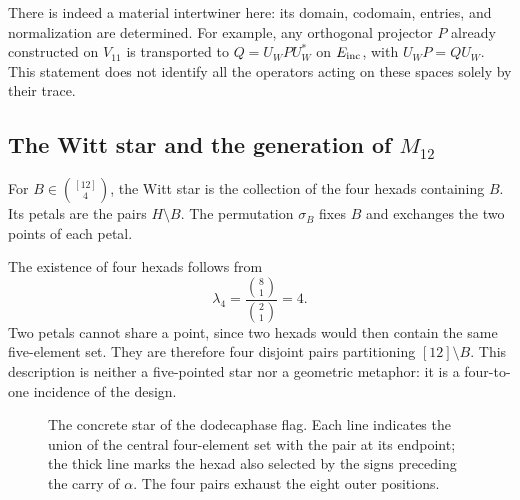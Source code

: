 There is indeed a material intertwiner here: its domain, codomain,
entries, and normalization are determined. For example, any
orthogonal projector $P$ already constructed on $V_{11}$ is transported to
$Q=U_WPU_W^*$ on $E_{\rm inc}$, with
$U_WP=QU_W$. This statement does not identify all the
operators acting on these spaces solely by their trace.



\subsection{The Witt star and the generation of \texorpdfstring{$M_{12}$}{M12}}
\label{exc:estrella}

\begin{definition}
\label{exc:def-estrella}
For $B\in\binom{[12]}4$, the Witt star is the collection of the
four hexads containing $B$. Its petals are the pairs $H\setminus B$.
The permutation $\sigma_B$ fixes $B$ and exchanges the two points of each
petal.
\end{definition}

The existence of four hexads follows from
\[
 \lambda_4=\frac{\binom81}{\binom21}=4.
\]
Two petals cannot share a point, since two hexads would then
contain the same five-element set. They are therefore four disjoint pairs
partitioning $[12]\setminus B$. This description is neither a five-pointed
star nor a geometric metaphor: it is a four-to-one incidence
of the design.

\begin{figure}[htbp]
\centering
{}
\caption{The concrete star of the dodecaphase flag. Each line
indicates the union of the central four-element set with the pair at its endpoint; the
thick line marks the hexad also selected by the signs
preceding the carry of $\alpha$. The four pairs exhaust the eight
outer positions.}
\label{exc:fig-estrella}
\end{figure}

